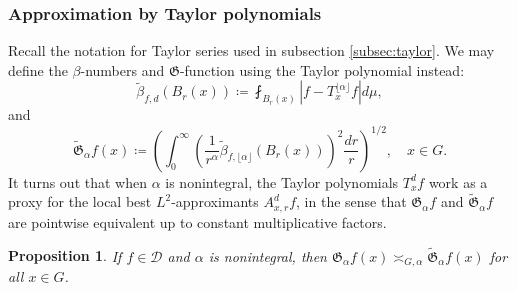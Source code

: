 \documentclass[11pt,reqno]{amsart}
\newtheorem{proposition}[theorem]{Proposition}
\newcommand{\1}{\mathbf 1}
\begin{document}
\subsubsection{Approximation by Taylor polynomials}\label{subsubsec:taylor}
Recall the notation for Taylor series used in subsection \ref{subsec:taylor}.
We may define the $\beta$-numbers and $\mathfrak{G}$-function using the Taylor polynomial instead:
\[
\tilde{\beta}_{f,d}\left(B_r\left(x\right)\right)\coloneqq \fint_{B_r\left(x\right)}\left|f-T^{\lfloor\alpha\rfloor}_{x}f\right|d\mu,
\]
and
\[
\tilde{\mathfrak{G}}_\alpha f\left(x\right)\coloneqq \left(\int_0^\infty \left(\frac{1}{r^\alpha}\tilde{\beta}_{f,\lfloor\alpha\rfloor}\left(B_r\left(x\right)\right)\right)^2 \frac{dr}r\right)^{1/2}, \quad x\in G.
\]
It turns out that when $\alpha$ is nonintegral, the Taylor polynomials $T^d_xf$ work as a proxy for the local best $L^2$-approximants $A^d_{x,r}f$, in the sense that $\mathfrak{G}_\alpha f$ and $\tilde{\mathfrak{G}}_\alpha f$ are pointwise equivalent up to constant multiplicative factors.
\begin{proposition}\label{prop:taylorIsEnough}
If $f\in \mathcal{D}$ and $\alpha$ is nonintegral, then $\mathfrak{G}_\alpha f\left(x\right)\asymp_{G,\alpha} \tilde{\mathfrak{G}}_\alpha f\left(x\right)$ for all $x\in G$.
\end{proposition}
\end{document}
